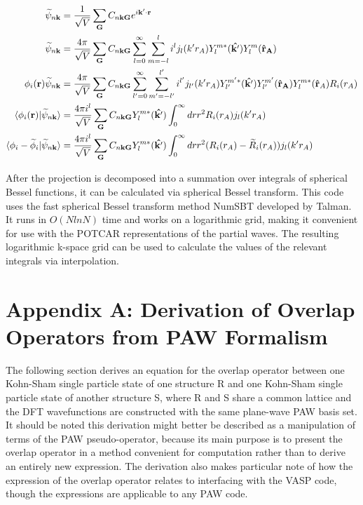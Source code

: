 \documentclass[12pt]{article}
\begin{document}
\begin{equation}
\begin{split}
\widetilde{\psi}_{n\mathbf{k}} & =\frac{1}{\sqrt{V}}\sum_{\mathbf{G}}
C_{n\mathbf{k}\mathbf{G}}e^{i\mathbf{k'}\cdot \mathbf{r}}\\
\widetilde{\psi}_{n\mathbf{k}} & =\frac{4\pi}{\sqrt{V}}\sum_{\mathbf{G}}
C_{n\mathbf{k}\mathbf{G}}\sum_{l=0}^{\infty}\sum_{m=-l}^{l}
i^l j_l(k'r_A)Y_l^{m*}(\mathbf{\hat{k'}})Y_l^m(\mathbf{\hat{r}_A})\\
\phi_i(\mathbf{r})\widetilde{\psi}_{n\mathbf{k}} & =\frac{4\pi}{\sqrt{V}}\sum_{\mathbf{G}}
C_{n\mathbf{k}\mathbf{G}}\sum_{l'=0}^{\infty}\sum_{m'=-l'}^{l'}
i^{l'} j_{l'}(k'r_A)Y_{l'}^{m'*}(\mathbf{\hat{k'}})Y_{l'}^{m'}(\mathbf{\hat{r}_A})
Y_l^{m*}(\mathbf{\hat{r}}_A)R_i(r_A)\\
\braket{\phi_i(\mathbf{r})|\widetilde{\psi}_{n\mathbf{k}}} & =
\frac{4\pi i^l}{\sqrt{V}}\sum_{\mathbf{G}} C_{n\mathbf{k}\mathbf{G}}
Y_l^{m*}(\mathbf{\hat{k'}})\int_0^{\infty}drr^2R_i(r_A)j_l(k'r_A)\\
\braket{\phi_i-\widetilde{\phi}_i|\widetilde{\psi}_{n\mathbf{k}}} & =
\frac{4\pi i^l}{\sqrt{V}}\sum_{\mathbf{G}} C_{n\mathbf{k}\mathbf{G}}
Y_l^{m*}(\mathbf{\hat{k'}})\int_0^{\infty}drr^2(R_i(r_A)-\widetilde{R}_i(r_A))j_l(k'r_A)
\end{split}
\end{equation}

After the projection is decomposed into a summation over integrals of spherical
Bessel functions, it can be calculated via spherical Bessel transform. This code
uses the fast spherical Bessel transform method NumSBT developed by Talman.\cite{TALMAN}
It runs in $O(NlnN)$ time and works on a logarithmic grid, making it convenient for use with
the POTCAR representations of the partial waves. The resulting logarithmic k-space
grid can be used to calculate the values of the relevant integrals via interpolation.

\section*{Appendix A: Derivation of Overlap Operators from PAW Formalism}

The following section derives an equation for the overlap operator between one
Kohn-Sham single particle state of one structure R and one Kohn-Sham single
particle state of another structure S, where R and S share a common lattice
and the DFT wavefunctions are constructed with the same plane-wave PAW basis set.
It should be noted this derivation might better be described as a manipulation
of terms of the PAW pseudo-operator, because its main purpose is to present
the overlap operator in a method convenient for computation rather than to derive
an entirely new expression. The derivation also makes particular note of how
the expression of the overlap operator relates to interfacing with the VASP code,
though the expressions are applicable to any PAW code.
\end{document}

